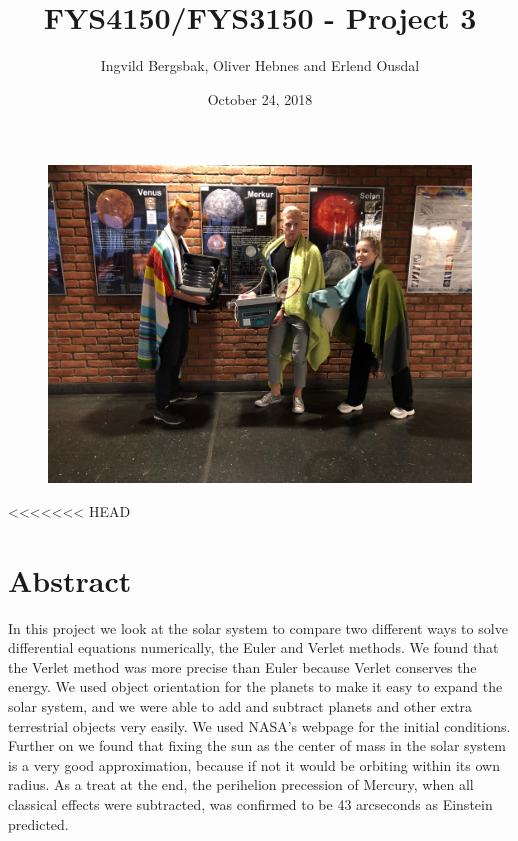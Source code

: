 \documentclass{article}
\begin{document}
\title{\textbf{FYS4150/FYS3150 - Project 3}}
\author{Ingvild Bergsbak, Oliver Hebnes and Erlend Ousdal}
\date{October 24, 2018}




\maketitle
\begin{figure}[H]
  \includegraphics[scale=0.15]{plots/group_pic.jpg}
  \label{}
  \centering
\end{figure}

<<<<<<< HEAD
\newpage
\section{Abstract}
In this project we look at the solar system to compare two different ways to solve differential equations numerically, the Euler and Verlet methods. We found that the Verlet method was more precise than Euler because Verlet conserves the energy. We used object orientation for the planets to make it easy to expand the solar system, and we were able to add and subtract planets and other extra terrestrial objects very easily. We used NASA's webpage \cite{NASA} for the initial conditions. Further on we found that fixing the sun as the center of mass in the solar system is a very good approximation, because if not it would be orbiting within its own radius. As a treat at the end, the perihelion precession of Mercury, when all classical effects were subtracted, was confirmed to be 43 arcseconds as Einstein predicted.
\end{document}
